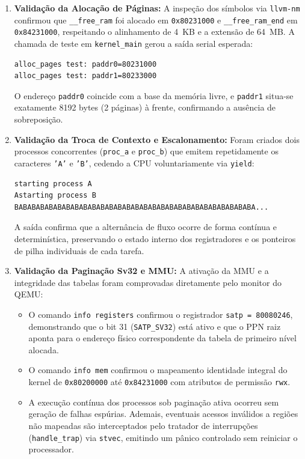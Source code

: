 \documentclass[12pt]{article}
\begin{document}
\begin{enumerate}
    \item \textbf{Validação da Alocação de Páginas:} A inspeção dos símbolos via \texttt{llvm-nm} confirmou que \texttt{\_\_free\_ram} foi alocado em \texttt{0x80231000} e \texttt{\_\_free\_ram\_end} em \texttt{0x84231000}, respeitando o alinhamento de 4~KB e a extensão de 64~MB. A chamada de teste em \texttt{kernel\_main} gerou a saída serial esperada:
\begin{verbatim}
alloc_pages test: paddr0=80231000
alloc_pages test: paddr1=80233000
\end{verbatim}
    O endereço \texttt{paddr0} coincide com a base da memória livre, e \texttt{paddr1} situa-se exatamente 8192 bytes (2 páginas) à frente, confirmando a ausência de sobreposição.

    \item \textbf{Validação da Troca de Contexto e Escalonamento:} Foram criados dois processos concorrentes (\texttt{proc\_a} e \texttt{proc\_b}) que emitem repetidamente os caracteres \texttt{'A'} e \texttt{'B'}, cedendo a CPU voluntariamente via \texttt{yield}:
\begin{verbatim}
starting process A
Astarting process B
BABABABABABABABABABABABABABABABABABABABABABABABABABABABA...
\end{verbatim}
    A saída confirma que a alternância de fluxo ocorre de forma contínua e determinística, preservando o estado interno dos registradores e os ponteiros de pilha individuais de cada tarefa.

    \item \textbf{Validação da Paginação Sv32 e MMU:} A ativação da MMU e a integridade das tabelas foram comprovadas diretamente pelo monitor do QEMU:
    \begin{itemize}
        \item O comando \texttt{info registers} confirmou o registrador \texttt{satp = 80080246}, demonstrando que o bit 31 (\texttt{SATP\_SV32}) está ativo e que o PPN raiz aponta para o endereço físico correspondente da tabela de primeiro nível alocada.
        \item O comando \texttt{info mem} confirmou o mapeamento identidade integral do kernel de \texttt{0x80200000} até \texttt{0x84231000} com atributos de permissão \texttt{rwx}.
        \item A execução contínua dos processos sob paginação ativa ocorreu sem geração de falhas espúrias. Ademais, eventuais acessos inválidos a regiões não mapeadas são interceptados pelo tratador de interrupções (\texttt{handle\_trap}) via \texttt{stvec}, emitindo um pânico controlado sem reiniciar o processador.
    \end{itemize}
\end{enumerate}
\end{document}
